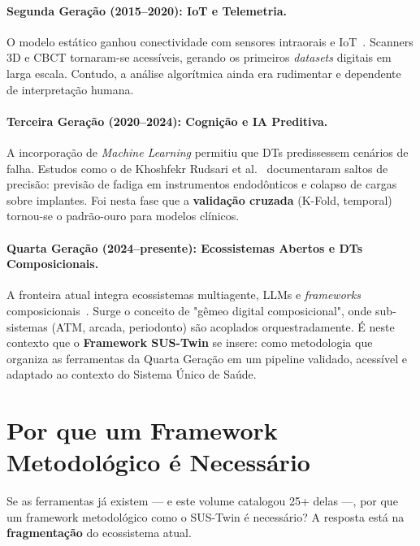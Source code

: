 \paragraph{Segunda Geração (2015--2020): IoT e Telemetria.}
O modelo estático ganhou conectividade com sensores intraorais e IoT~\cite{mormann2004cerec}. Scanners 3D e CBCT tornaram-se acessíveis, gerando os primeiros \textit{datasets} digitais em larga escala. Contudo, a análise algorítmica ainda era rudimentar e dependente de interpretação humana.

\paragraph{Terceira Geração (2020--2024): Cognição e IA Preditiva.}
A incorporação de \textit{Machine Learning} permitiu que DTs predissessem cenários de falha. Estudos como o de Khoshfekr Rudsari et al.~\cite{khoshfekr2025digital} documentaram saltos de precisão: previsão de fadiga em instrumentos endodônticos e colapso de cargas sobre implantes. Foi nesta fase que a \textbf{validação cruzada} (K-Fold, temporal) tornou-se o padrão-ouro para modelos clínicos.

\paragraph{Quarta Geração (2024--presente): Ecossistemas Abertos e DTs Composicionais.}
A fronteira atual integra ecossistemas multiagente, LLMs e \textit{frameworks} composicionais~\cite{robles2023opentwins}. Surge o conceito de "gêmeo digital composicional", onde sub-sistemas (ATM, arcada, periodonto) são acoplados orquestradamente. É neste contexto que o \textbf{Framework SUS-Twin} se insere: como metodologia que organiza as ferramentas da Quarta Geração em um pipeline validado, acessível e adaptado ao contexto do Sistema Único de Saúde.


\section{Por que um Framework Metodológico é Necessário}

Se as ferramentas já existem --- e este volume catalogou 25+ delas ---, por que um framework metodológico como o SUS-Twin é necessário? A resposta está na \textbf{fragmentação} do ecossistema atual.

